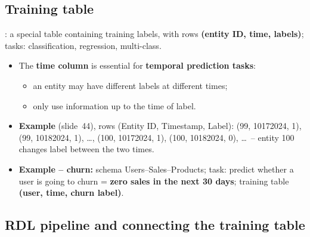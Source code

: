 \subsection{Training table}\label{sec:lec12-training}

\begin{definition}\label{def:lec12-train}
  : a special table containing training labels, with rows
  \textbf{(entity ID, time, labels)}; tasks: classification, regression, multi-class.
\end{definition}

\begin{itemize}
  \item The \textbf{time column} is essential for \textbf{temporal prediction tasks}:
    \begin{itemize}
      \item an entity may have different labels at different times;
      \item only use information up to the time of label.
    \end{itemize}
  \item \textbf{Example} (slide~44), rows (Entity ID, Timestamp, Label): (99, 10172024, 1),
    (99, 10182024, 1), \dots, (100, 10172024, 1), (100, 10182024, 0), \dots\ -- entity
    100 changes label between the two times.
  \item \textbf{Example -- churn:} schema Users--Sales--Products; task: predict whether a
    user is going to churn = \textbf{zero sales in the next 30 days}; training table
    \textbf{(user, time, churn label)}.
\end{itemize}

\subsection{RDL pipeline and connecting the training table}\label{sec:lec12-pipeline}

